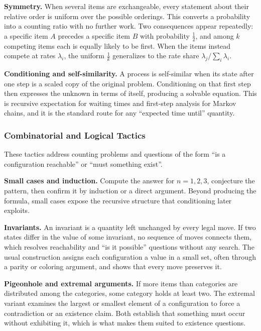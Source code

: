 \textbf{Symmetry.} When several items are exchangeable, every statement about their relative order is uniform over the possible orderings. This converts a probability into a counting ratio with no further work. Two consequences appear repeatedly: a specific item $A$ precedes a specific item $B$ with probability $\tfrac{1}{2}$, and among $k$ competing items each is equally likely to be first. When the items instead compete at rates $\lambda_i$, the uniform $\tfrac{1}{k}$ generalizes to the rate share $\lambda_j / \sum_i \lambda_i$.

\textbf{Conditioning and self-similarity.} A process is self-similar when its state after one step is a scaled copy of the original problem. Conditioning on that first step then expresses the unknown in terms of itself, producing a solvable equation. This is recursive expectation for waiting times and first-step analysis for Markov chains, and it is the standard route for any ``expected time until'' quantity.

\subsubsection{Combinatorial and Logical Tactics}

These tactics address counting problems and questions of the form ``is a configuration reachable'' or ``must something exist''.

\textbf{Small cases and induction.} Compute the answer for $n = 1, 2, 3$, conjecture the pattern, then confirm it by induction or a direct argument. Beyond producing the formula, small cases expose the recursive structure that conditioning later exploits.

\textbf{Invariants.} An invariant is a quantity left unchanged by every legal move. If two states differ in the value of some invariant, no sequence of moves connects them, which resolves reachability and ``is it possible'' questions without any search. The usual construction assigns each configuration a value in a small set, often through a parity or coloring argument, and shows that every move preserves it.

\textbf{Pigeonhole and extremal arguments.} If more items than categories are distributed among the categories, some category holds at least two. The extremal variant examines the largest or smallest element of a configuration to force a contradiction or an existence claim. Both establish that something must occur without exhibiting it, which is what makes them suited to existence questions.

